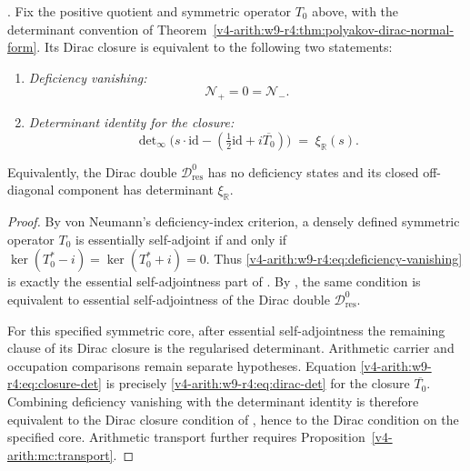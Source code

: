 \begin{theorem}
\label{v4-arith:w9-r4:thm:dirac-two-test}
\ClaimStatusProvedHereConditional. Fix the positive quotient and
symmetric operator $T_0$ above, with the determinant convention of
Theorem~\ref{v4-arith:w9-r4:thm:polyakov-dirac-normal-form}.
Its Dirac closure is equivalent to the following two statements:
\begin{enumerate}
\item \emph{Deficiency vanishing:}
\begin{equation}
\label{v4-arith:w9-r4:eq:deficiency-vanishing}
\mathcal{N}_{+}=0=\mathcal{N}_{-}.
\end{equation}
\item \emph{Determinant identity for the closure:}
\begin{equation}
\label{v4-arith:w9-r4:eq:closure-det}
\det\nolimits_{\infty}
\bigl(s\cdot\mathrm{id}
-({\tfrac12}\mathrm{id}+i\overline{T_{0}})\bigr)
\;=\;
\xi_{\mathbb{R}}(s).
\end{equation}
\end{enumerate}
Equivalently, the Dirac double
\(\mathscr{D}_{\mathrm{res}}^{0}\) has no deficiency states and its
closed off-diagonal component has determinant \(\xi_{\mathbb R}\).
\end{theorem}

\begin{proof}
By von Neumann's deficiency-index criterion, a densely defined
symmetric operator \(T_{0}\) is essentially self-adjoint if and only
if
\(\ker(T_{0}^{*}-i)=\ker(T_{0}^{*}+i)=0\). Thus
\eqref{v4-arith:w9-r4:eq:deficiency-vanishing} is exactly the
essential self-adjointness part of
. By
, the same
condition is equivalent to essential self-adjointness of the Dirac
double \(\mathscr{D}_{\mathrm{res}}^{0}\).

For this specified symmetric core, after essential self-adjointness
the remaining clause of its Dirac closure is the regularised
determinant. Arithmetic carrier and occupation comparisons remain
separate hypotheses. Equation
\eqref{v4-arith:w9-r4:eq:closure-det} is precisely
\eqref{v4-arith:w9-r4:eq:dirac-det} for the closure
\(\overline{T_{0}}\). Combining deficiency vanishing with the
determinant identity is therefore equivalent to the Dirac closure
condition of
, hence to the
Dirac condition on the specified core. Arithmetic transport further
requires Proposition~\ref{v4-arith:mc:transport}.
\end{proof}

